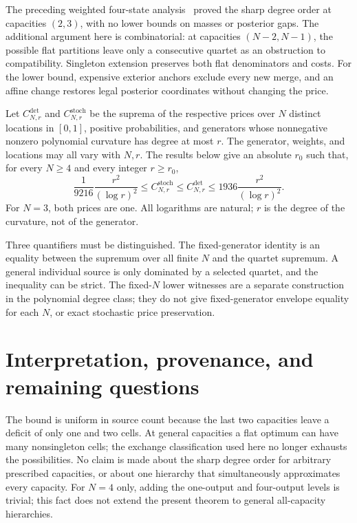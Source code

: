 \documentclass[11pt]{article}
\theoremstyle{remark}\newtheorem{remark}[theorem]{Remark}
\newcommand{\detp}{\mathrm{det}}
\newcommand{\stp}{\mathrm{stoch}}
\begin{document}
The preceding weighted four-state analysis~\cite{huang9} proved the sharp
degree order at capacities $(2,3)$, with no lower bounds on masses or
posterior gaps. The additional argument here is combinatorial: at
capacities $(N-2,N-1)$, the possible flat partitions leave only a
consecutive quartet as an obstruction to compatibility. Singleton
extension preserves both flat denominators and costs. For the lower
bound, expensive exterior anchors exclude every new merge, and an affine
change restores legal posterior coordinates without changing the price.

Let $C_{N,r}^{\detp}$ and $C_{N,r}^{\stp}$ be the suprema of the respective
prices over $N$ distinct locations in $[0,1]$, positive probabilities, and
generators whose nonnegative nonzero polynomial curvature has degree at
most $r$. The generator, weights, and locations may all vary with $N,r$.
The results below give an absolute $r_0$ such that, for every $N\ge4$
and every integer $r\ge r_0$,
\begin{equation}
 \frac{1}{9216}\frac{r^2}{(\log r)^2}
 \le C_{N,r}^{\stp}\le C_{N,r}^{\detp}
 \le1936\frac{r^2}{(\log r)^2}.
 \label{eq:sharp-envelope}
\end{equation}
For $N=3$, both prices are one. All logarithms are natural; $r$ is the
degree of the curvature, not of the generator.

Three quantifiers must be distinguished. The fixed-generator identity is
an equality between the supremum over all finite $N$ and the quartet
supremum. A general individual source is only dominated by a selected
quartet, and the inequality can be strict. The fixed-$N$ lower witnesses
are a separate construction in the polynomial degree class; they do not
give fixed-generator envelope equality for each $N$, or exact stochastic
price preservation.









\section{Interpretation, provenance, and remaining questions}
The bound is uniform in source count because the last two capacities
leave a deficit of only one and two cells. At general capacities a flat
optimum can have many nonsingleton cells; the exchange classification used
here no longer exhausts the possibilities. No claim is made about the
sharp degree order for arbitrary prescribed capacities, or about one
hierarchy that simultaneously approximates every capacity. For $N=4$
only, adding the one-output and four-output levels is trivial; this fact
does not extend the present theorem to general all-capacity hierarchies.
\end{document}
